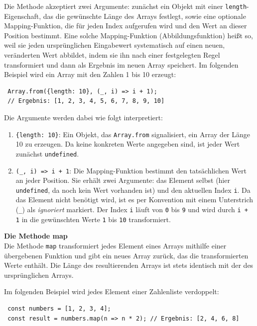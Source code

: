 Die Methode akzeptiert zwei Argumente: zunächst ein Objekt mit einer \texttt{length}-Eigenschaft, das die gewünschte Länge des Arrays festlegt, sowie eine optionale Mapping-Funktion, die für jeden Index aufgerufen wird und den Wert an dieser Position bestimmt. Eine solche Mapping-Funktion (Abbildungsfunktion) heißt so, weil sie jeden ursprünglichen Eingabewert systematisch auf einen neuen, veränderten Wert abbildet, indem sie ihn nach einer festgelegten Regel transformiert und dann als Ergebnis im neuen Array speichert. Im folgenden Beispiel wird ein Array mit den Zahlen 1 bis 10 erzeugt:
\begin{verbatim}
 Array.from({length: 10}, (_, i) => i + 1);
 // Ergebnis: [1, 2, 3, 4, 5, 6, 7, 8, 9, 10]
\end{verbatim}

Die Argumente werden dabei wie folgt interpretiert:
\begin{enumerate}
	\item \texttt{\{length: 10\}}: Ein Objekt, das \texttt{Array.from} signalisiert, ein Array der Länge 10 zu erzeugen. Da keine konkreten Werte angegeben sind, ist jeder Wert zunächst \texttt{undefined}.
	\item \texttt{(\_, i) => i + 1}: Die Mapping-Funktion bestimmt den tatsächlichen Wert an jeder Position. Sie erhält zwei Argumente: das Element selbst (hier \texttt{undefined}, da noch kein Wert vorhanden ist) und den aktuellen Index \texttt{i}. Da das Element nicht benötigt wird, ist es per Konvention mit einem Unterstrich (\texttt{\_}) als \emph{ignoriert} markiert. Der Index \texttt{i} läuft von \texttt{0} bis \texttt{9} und wird durch \texttt{i + 1} in die gewünschten Werte \texttt{1} bis \texttt{10} transformiert.
\end{enumerate}

\textbf{Die Methode map}\\
Die Methode \texttt{map} transformiert jedes Element eines Arrays mithilfe einer übergebenen Funktion und gibt ein neues Array zurück, das die transformierten Werte enthält. Die Länge des resultierenden Arrays ist stets identisch mit der des ursprünglichen Arrays.

Im folgenden Beispiel wird jedes Element einer Zahlenliste verdoppelt:
\begin{verbatim}
 const numbers = [1, 2, 3, 4];
 const result = numbers.map(n => n * 2); // Ergebnis: [2, 4, 6, 8]
\end{verbatim}


